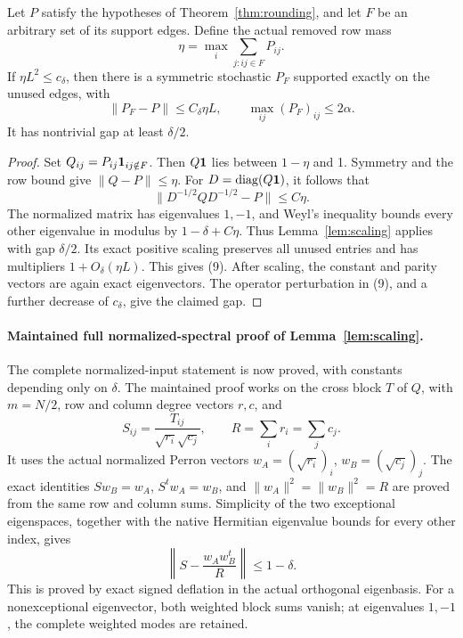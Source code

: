 \begin{corollary}
\label{cor:forbiddenrepair}
Let \(P\) satisfy the hypotheses of Theorem~\ref{thm:rounding},
and let \(F\) be an arbitrary set of its support edges.
Define the actual removed row mass
\[
 \eta=\max_i\sum_{j:ij\in F}P_{ij}.
\]
If \(\eta L^2\leq c_\delta\), then there is a symmetric
stochastic \(P_F\) supported exactly on the unused edges, with
\[
 \|P_F-P\|\leq C_\delta\eta L,\qquad
 \max_{ij}(P_F)_{ij}\leq2\alpha.                             \tag{9}
\]
It has nontrivial gap at least \(\delta/2\).
\end{corollary}
\begin{proof}
Set \(Q_{ij}=P_{ij}\mathbf1_{ij\notin F}\).
Then \(Q\mathbf1\) lies between \(1-\eta\) and 1.
Symmetry and the row bound give
\(\|Q-P\|\leq\eta\).
For \(D=\operatorname{diag}(Q\mathbf1)\), it follows that
\[
 \|D^{-1/2}QD^{-1/2}-P\|\leq C\eta.
\]
The normalized matrix has eigenvalues \(1,-1\), and Weyl's
inequality bounds every other eigenvalue in modulus by
\(1-\delta+C\eta\).
Thus Lemma~\ref{lem:scaling} applies with gap \(\delta/2\).
Its exact positive scaling preserves all unused entries and
has multipliers \(1+O_\delta(\eta L)\).
This gives (9).
After scaling, the constant and parity vectors are again exact
eigenvectors. The operator perturbation in (9), and a further
decrease of \(c_\delta\), give the claimed gap.
\end{proof}

\paragraph{Maintained full normalized-spectral proof of Lemma~\ref{lem:scaling}.}
The complete normalized-input statement is now proved, with constants
depending only on \(\delta\). The maintained proof works on the cross
block \(T\) of \(Q\), with \(m=N/2\), row and column degree vectors
\(r,c\), and
\[
 S_{ij}=\frac{T_{ij}}{\sqrt{r_i}\sqrt{c_j}},\qquad
 R=\sum_i r_i=\sum_j c_j.
\]
It uses the actual normalized Perron vectors
\(w_A=(\sqrt{r_i})_i\), \(w_B=(\sqrt{c_j})_j\).
The exact identities \(Sw_B=w_A\), \(S^tw_A=w_B\), and
\(\|w_A\|^2=\|w_B\|^2=R\) are proved from the same row and
column sums. Simplicity of the two exceptional eigenspaces,
together with the native Hermitian eigenvalue bounds for every
other index, gives
\[
 \left\|S-\frac{w_Aw_B^t}{R}\right\|\leq1-\delta.
\]
This is proved by exact signed deflation in the actual orthogonal
eigenbasis. For a nonexceptional eigenvector, both weighted block
sums vanish; at eigenvalues \(1,-1\), the complete weighted modes
are retained.


